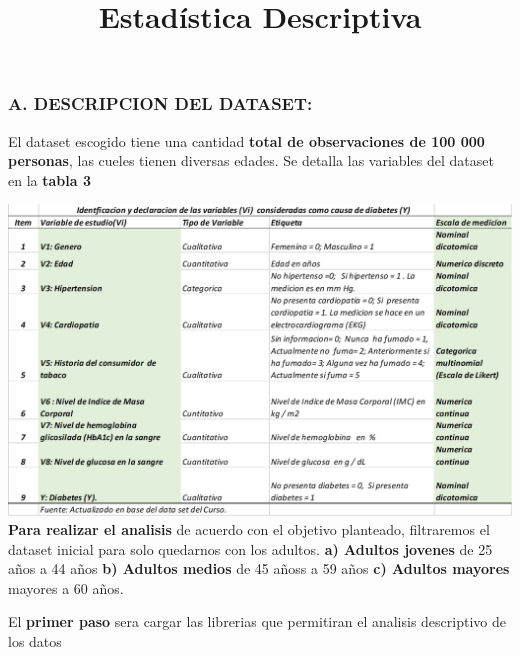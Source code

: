 \documentclass[
]{article}
\title{Estadística Descriptiva}
\author{}
\date{\vspace{-2.5em}}
\begin{document}
\maketitle

{
\setcounter{tocdepth}{2}
\tableofcontents
}
\hypertarget{a.-descripcion-del-dataset}{%
\subsubsection{\texorpdfstring{\textbf{A. DESCRIPCION DEL
DATASET:}}{A. DESCRIPCION DEL DATASET:}}\label{a.-descripcion-del-dataset}}

El dataset escogido tiene una cantidad \textbf{total de observaciones de
100 000 personas}, las cueles tienen diversas edades. Se detalla las
variables del dataset en la \textbf{tabla 3}

\includegraphics[width=1\linewidth]{tipo_variable} \textbf{Para realizar
el analisis} de acuerdo con el objetivo planteado, filtraremos el
dataset inicial para solo quedarnos con los adultos. \textbf{a) Adultos
jovenes} de 25 años a 44 años \textbf{b) Adultos medios} de 45 añoss a
59 años \textbf{c) Adultos mayores} mayores a 60 años.

El \textbf{primer paso} sera cargar las librerias que permitiran el
analisis descriptivo de los datos
\end{document}
